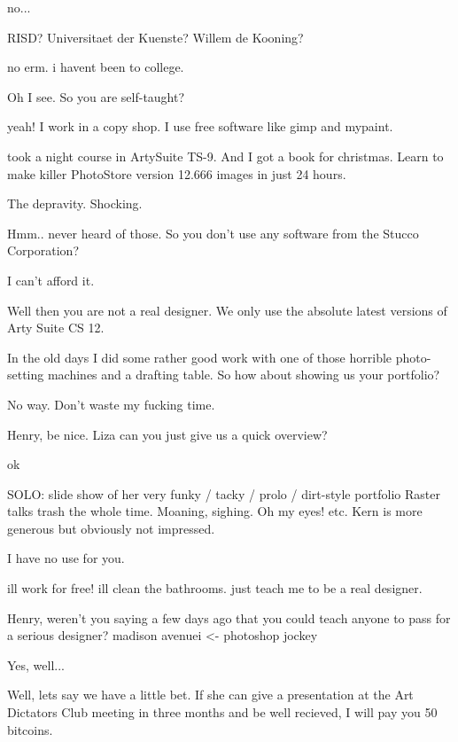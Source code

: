  no...

 RISD?  Universitaet der Kuenste?  Willem de Kooning?

 no erm.  i havent been to college.

 Oh I see.  So you are self-taught?

 yeah!  I work in a copy shop.  I use free software like gimp and mypaint.

took a night course in ArtySuite TS-9. And I got a book for christmas.  Learn to make killer PhotoStore version 12.666 images in just 24 hours. 

 The depravity.  Shocking.

 Hmm.. never heard of those.  So you don't use any software from the Stucco Corporation?

 I can't afford it.  

 Well then you are not a real designer.  We only use the absolute latest versions of Arty Suite CS 12.

 In the old days I did some rather good work with one of those horrible photo-setting machines and a drafting table.  So how about showing us your portfolio?

 No way.  Don't waste my fucking time.

 Henry, be nice.  Liza can you just give us a quick overview?

 ok

SOLO: slide show of her very funky / tacky / prolo / dirt-style portfolio 
Raster talks trash the whole time.  Moaning, sighing.  Oh my eyes! etc.
Kern is more generous but obviously not impressed.


 I have no use for you.

 ill work for free!  ill clean the bathrooms.  just teach me to be a real designer.

 Henry, weren't you saying a few days ago that you could teach anyone to pass for a serious designer? madison avenuei <- photoshop jockey

 Yes, well...

 Well, lets say we have a little bet.  If she can give a presentation at the Art Dictators Club meeting in three months and be well recieved, I will pay you 50 bitcoins.

